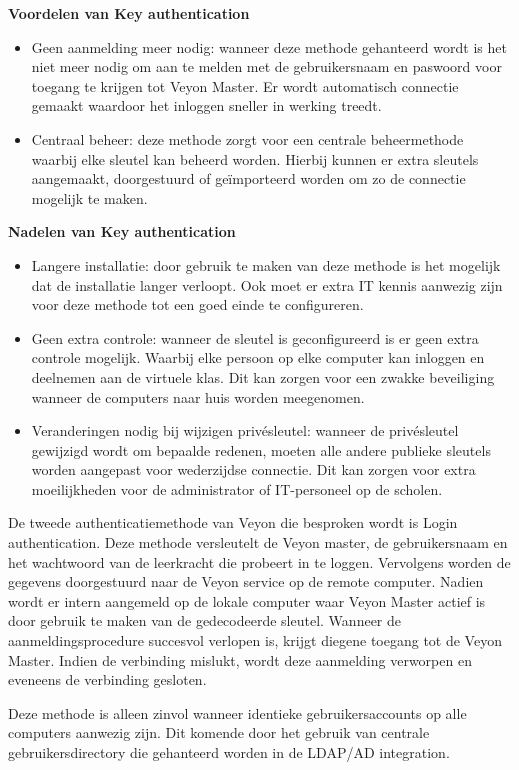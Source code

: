  
 \textbf{Voordelen van Key authentication}
 \begin{itemize}
     \item Geen aanmelding meer nodig: wanneer deze methode gehanteerd wordt is het niet meer nodig om aan te melden met de gebruikersnaam en paswoord voor toegang te krijgen tot Veyon Master. Er wordt automatisch connectie gemaakt waardoor het inloggen sneller in werking treedt. 
     \item Centraal beheer: deze methode zorgt voor een centrale beheermethode waarbij elke sleutel kan beheerd worden. Hierbij kunnen er extra sleutels aangemaakt, doorgestuurd of geïmporteerd worden om zo de connectie mogelijk te maken.
 \end{itemize}
  \textbf{Nadelen van Key authentication}
 \begin{itemize}
     \item Langere installatie: door gebruik te maken van deze methode is het mogelijk dat de installatie langer verloopt. Ook moet er extra IT kennis aanwezig zijn voor deze methode tot een goed einde te configureren.
     \item Geen extra controle: wanneer de sleutel is geconfigureerd is er geen extra controle mogelijk. Waarbij elke persoon op elke computer kan inloggen en deelnemen aan de virtuele klas. Dit kan zorgen voor een zwakke beveiliging wanneer de computers naar huis worden meegenomen.
     \item Veranderingen nodig bij wijzigen privésleutel: wanneer de privésleutel gewijzigd wordt om bepaalde redenen, moeten alle andere publieke sleutels worden aangepast voor wederzijdse connectie. Dit kan zorgen voor extra moeilijkheden voor de administrator of IT-personeel op de scholen.
 \end{itemize}
 De tweede authenticatiemethode van Veyon die besproken wordt is Login authentication.
 Deze methode versleutelt de Veyon master, de gebruikersnaam en het wachtwoord van de leerkracht die probeert in te loggen. Vervolgens worden de gegevens doorgestuurd naar de Veyon service op de remote computer. Nadien wordt er intern aangemeld op de lokale computer waar Veyon Master actief is door gebruik te maken van de gedecodeerde sleutel. Wanneer de aanmeldingsprocedure succesvol verlopen is, krijgt diegene toegang tot de Veyon Master. Indien de verbinding mislukt, wordt deze aanmelding verworpen en eveneens de verbinding gesloten.
 
 Deze methode is alleen zinvol wanneer identieke gebruikersaccounts op alle computers aanwezig zijn. Dit komende door het gebruik van centrale gebruikersdirectory die gehanteerd worden in de LDAP/AD integration. 
 
